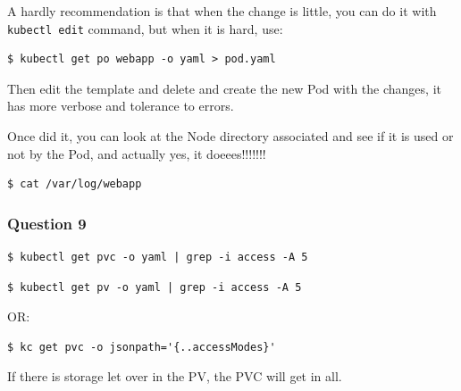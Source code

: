 \documentclass{article}
\newenvironment{blocktemplateIII}[1]{%
    \tcolorbox[beamer,%
    noparskip,breakable,
    ,colframe=Red,%
    colbacklower=LimeGreen!75!LightGreen,%
    title=#1]}%
    {\endtcolorbox}
\newenvironment{codetemplate}[1][]{%
  \mybasecolorbox[#1]
  \itshape
}{%
  \endmybasecolorbox
}
\begin{document}
A hardly recommendation is that when the change is little, you can do it with \verb|kubectl edit| command, but when it is hard, use:

\begin{codetemplate}{}
\begin{verbatim}
$ kubectl get po webapp -o yaml > pod.yaml
\end{verbatim}
\end{codetemplate}

Then edit the template and delete and create the new Pod with the changes, it has more verbose and tolerance to errors.

Once did it, you can look at the Node directory associated and see if it is used or not by the Pod, and actually yes, it doeees!!!!!!!

\begin{codetemplate}{}
\begin{verbatim}
$ cat /var/log/webapp
\end{verbatim}
\end{codetemplate}

\subsubsection{Question 9}

\begin{codetemplate}{}
\begin{verbatim}
$ kubectl get pvc -o yaml | grep -i access -A 5
\end{verbatim}
\end{codetemplate}

\begin{codetemplate}{}
\begin{verbatim}
$ kubectl get pv -o yaml | grep -i access -A 5
\end{verbatim}
\end{codetemplate}

OR:

\begin{codetemplate}{}
\begin{verbatim}
$ kc get pvc -o jsonpath='{..accessModes}'
\end{verbatim}
\end{codetemplate}

\begin{blocktemplateIII}{WARNING}
If there is storage let over in the PV, the PVC will get in all.
\end{blocktemplateIII}
\end{document}
